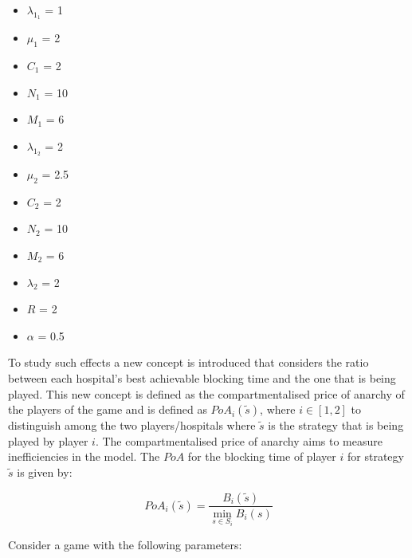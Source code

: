 \begin{multicols}{3}
    \begin{itemize} \label{eq:ard-parameters}
        \item \( \lambda_{1_1} \) = 1
        \item \( \mu_1 \) = 2
        \item \( C_1 \) = 2
        \item \( N_1 \) = 10
        \item \( M_1 \) = 6

        \columnbreak
        \item \( \lambda_{1_2} \) = 2
        \item \( \mu_2 \) = 2.5
        \item \( C_2 \) = 2
        \item \( N_2 \) = 10
        \item \( M_2 \) = 6
        
        \columnbreak
        \item \( \lambda_2 \) = 2
        \item \( R \) = 2
        \item \( \alpha \) = 0.5
    \end{itemize}
\end{multicols}

To study such effects a new concept is introduced that considers the ratio 
between each hospital's best achievable blocking time and the one that is being
played.
This new concept is defined as the compartmentalised price of anarchy of the 
players of the game and is defined as \(PoA_i(\tilde{s})\), where 
\(i \in [1, 2]\) to distinguish among the two players/hospitals where 
\(\tilde{s}\) is the strategy that is being played by player \( i \). 
The compartmentalised price of anarchy aims to measure inefficiencies in the 
model.
The \(PoA\) for the blocking time of player \(i\) for strategy \(\tilde{s}\) 
is given by:

\begin{equation}\label{eq:poa_compartmentalised}
    PoA_{i}(\tilde{s}) = \frac{B_i(\tilde{s})}{\min_{s \in S_i} B_i(s)}
\end{equation}

Consider a game with the following parameters:


